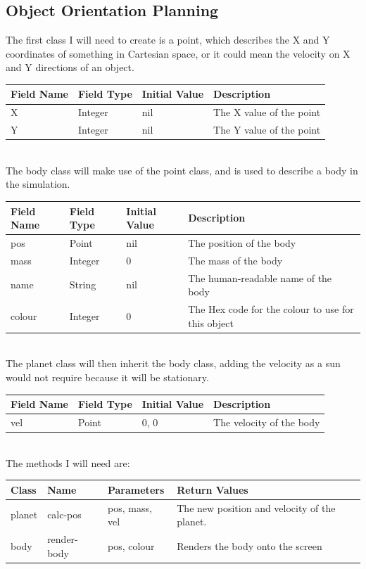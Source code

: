 \subsection{Object Orientation Planning}
The first class I will need to create is a point, which describes the X and Y
coordinates of something in Cartesian space, or it could mean the velocity on X
and Y directions of an object. \\

\begin{tabularx}{\linewidth}{lllX}
	Field Name & Field Type & Initial Value & Description \\ \hline
	X & Integer & nil & The X value of the point \\
	Y & Integer & nil & The Y value of the point \\
\end{tabularx} \\

The body class will make use of the point class, and is used to describe a body
in the simulation. \\

\begin{tabularx}{\linewidth}{lllX}
	Field Name & Field Type & Initial Value & Description \\ \hline
	pos	& Point		& nil		& The position of the body \\
	mass	& Integer	& 0		& The mass of the body \\
	name	& String	& nil 		& The human-readable name of the
							body \\
	colour	& Integer	& 0		& The Hex code for the colour to
							use for this object \\
\end{tabularx} \\

The planet class will then inherit the body class, adding the velocity as a sun
would not require because it will be stationary. \\

\begin{tabularx}{\linewidth}{lllX} 
	Field Name & Field Type & Initial Value & Description \\ \hline
	vel	& Point		& 0, 0		& The velocity of the body \\
\end{tabularx} \\

The methods I will need are: \\

\begin{tabularx}{\linewidth}{lllX}
	Class & Name & Parameters & Return Values \\ \hline
	planet & calc-pos & pos, mass, vel & The new position and velocity of
	the planet. \\
	body & render-body & pos, colour & Renders the body onto the screen
\end{tabularx} \\


